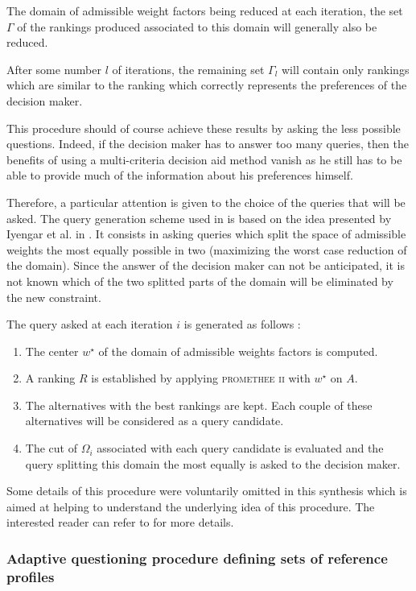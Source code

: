 The domain of admissible weight factors being reduced at each iteration, the set $\Gamma$ of the rankings produced associated to this domain will generally also be reduced.

After some number $l$ of iterations, the remaining set $\Gamma_l$ will contain only rankings which are similar to the ranking which correctly represents the preferences of the decision maker.

This procedure should of course achieve these results by asking the less possible questions.
Indeed, if the decision maker has to answer too many queries, then the benefits of using a multi-criteria decision aid method vanish as he still has to be able to provide much of the information about his preferences himself.

Therefore, a particular attention is given to the choice of the queries that will be asked.
The query generation scheme used in \cite{eppe2014adaptive} is based on the idea presented by Iyengar et al. in \cite{iyengar2001evaluating}. It consists in asking queries which split the space of admissible weights the most equally possible in two (maximizing the worst case reduction of the domain).
Since the answer of the decision maker can not be anticipated, it is not known which of the two splitted parts of the domain will be eliminated by the new constraint.

The query asked at each iteration $i$ is generated as follows \cite{eppe2014adaptive}:
\begin{enumerate}
    \item The center $w^{\star}$ of the domain of admissible weights factors is computed.
    \item A ranking $R$ is established by applying \textsc{promethee ii} with $w^{\star}$ on $A$.
    \item The alternatives with the best rankings are kept. Each couple of these alternatives will be considered as a query candidate.
    \item The cut of $\Omega_i$ associated with each query candidate is evaluated and the query splitting this domain the most equally is asked to the decision maker.
\end{enumerate}

Some details of this procedure were voluntarily omitted in this synthesis which is aimed at helping to understand the underlying idea of this procedure. The interested reader can refer to \cite{eppe2014adaptive} for more details.

\subsubsection{Adaptive questioning procedure defining sets of reference profiles}

